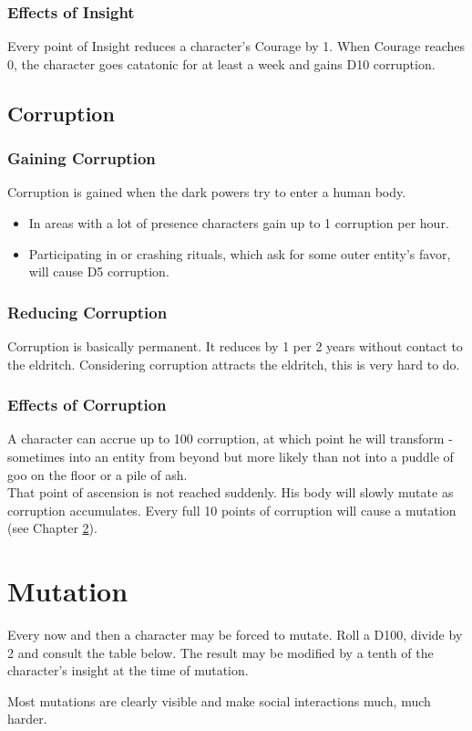 \documentclass[12pt,a4paper,openany]{book}
\begin{document}
	\subsection{Effects of Insight}
	Every point of Insight reduces a character's Courage by 1. When Courage reaches 0, the character goes catatonic for at least a week and gains D10 corruption.
	
	\section{Corruption}
	\subsection{Gaining Corruption}
	Corruption is gained when the dark powers try to enter a human body. 
	\vspace{-8mm}
	\begin{itemize}
		\setlength\itemsep{-8mm}
		\item In areas with a lot of presence characters gain up to 1 corruption per hour.
		\item Participating in or crashing rituals, which ask for some outer entity's favor, will cause D5 corruption.
	\end{itemize}
	\subsection{Reducing Corruption}
	Corruption is basically permanent. It reduces by 1 per 2 years without contact to the eldritch. Considering corruption attracts the eldritch, this is very hard to do.
	\subsection{Effects of Corruption}
	A character can accrue up to 100 corruption, at which point he will transform - sometimes into an entity from beyond but more likely than not into a puddle of goo on the floor or a pile of ash.\\
	That point of ascension is not reached suddenly. His body will slowly mutate as corruption accumulates. Every full 10 points of corruption will cause a mutation (see Chapter \ref{ch:mutation}).
	
	\chapter{Mutation}
	\label{ch:mutation}
	Every now and then a character may be forced to mutate. Roll a D100, divide by 2 and consult the table below. The result may be modified by a tenth of the character's insight at the time of mutation.
	\par
	Most mutations are clearly visible and make social interactions much, much harder.
	\par
	\begin{multicols}{2}
		\begin{enumerate}
			\setlength\itemsep{-10mm}
		\end{enumerate}
	\end{multicols}
	
\end{document}
